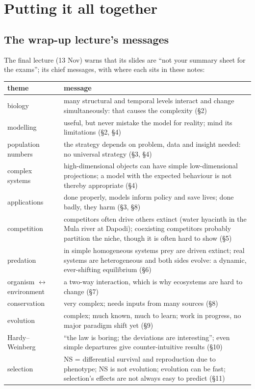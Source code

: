 \section{Putting it all together}

\subsection{The wrap-up lecture's messages}
The final lecture (13 Nov) warns that its slides are ``not your summary sheet for the exams''; its chief messages, with
where each sits in these notes:
\begin{center}\small
\begin{tabularx}{\textwidth}{lX}
\toprule
theme & message\\\midrule
biology & many structural and temporal levels interact and change simultaneously: that causes the complexity (\S2)\\
modelling & useful, but never mistake the model for reality; mind its limitations (\S2, \S4)\\
population numbers & the strategy depends on problem, data and insight needed: no universal strategy (\S3, \S4)\\
complex systems & high-dimensional objects can have simple low-dimensional projections; a model with the expected behaviour
is not thereby appropriate (\S4)\\
applications & done properly, models inform policy and save lives; done badly, they harm (\S3, \S8)\\
competition & competitors often drive others extinct (water hyacinth in the Mula river at Dapodi); coexisting competitors
probably partition the niche, though it is often hard to show (\S5)\\
predation & in simple homogeneous systems prey are driven extinct; real systems are heterogeneous and both sides evolve: a
dynamic, ever-shifting equilibrium (\S6)\\
organism $\leftrightarrow$ environment & a two-way interaction, which is why ecosystems are hard to change (\S7)\\
conservation & very complex; needs inputs from many sources (\S8)\\
evolution & complex; much known, much to learn; work in progress, no major paradigm shift yet (\S9)\\
Hardy--Weinberg & ``the law is boring; the deviations are interesting''; even simple departures give counter-intuitive results (\S10)\\
selection & NS = differential survival and reproduction due to phenotype; NS is not evolution; evolution can be fast;
selection's effects are not always easy to predict (\S11)\\\bottomrule
\end{tabularx}
\end{center}

